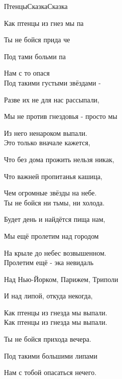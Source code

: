 \documentclass[11pt,a5paper]{book}
\begin{document}
\begin{song}{Птенцы}{}{Сказка}{Сказка}{}{}

  

Как птенцы из гнез мы па\par
Ты не бойся прида че\par
Под тами больми па\par
Нам с то опася \\
 
Под такими густыми звёздами -\par
Разве их не для нас рассыпали,\par
Мы не против гнездовья - просто мы\par
Из него ненароком выпали.\\

Это только вначале кажется,\par
Что без дома прожить нельзя никак,\par
Что важней пропитанья кашица,\par
Чем огромные звёзды на небе.\\

Ты не бойся ни тьмы, ни холода.\par
Будет день и найдётся пища нам,\par
Мы ещё пролетим над городом\par
На крыле до небес возвышенном.\\

Пролетим ещё - эка невидаль\par
Над Нью-Йорком, Парижем, Триполи\par
И над липой, откуда некогда,\par
Как птенцы из гнезда мы выпали.\\

Как птенцы из гнезда мы выпали.\par
Ты не бойся прихода вечера.\par
Под такими большими липами\par
Нам с тобой опасаться нечего.\\

\end{song}
\end{document}
